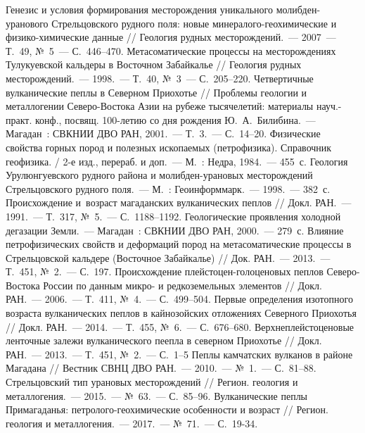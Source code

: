 \begin{thebibliography}{99}
\bibitem{} Генезис и условия формирования месторождения уникального молибден-уранового Стрельцовского рудного поля: новые минералого-геохимические и физико-химические данные // Геология рудных месторождений.~--- 2007~--- Т.~49, №~5~--- С.~446--470.
\bibitem{} Метасоматические процессы на месторождениях Тулукуевской кальдеры в Восточном Забайкалье // Геология рудных месторождений.~--- 1998.~--- Т.~40, №~3~--- С.~205--220.
\bibitem{} Четвертичные вулканические пеплы в Северном Приохотье // Проблемы геологии и металлогении Северо-Востока Азии на рубеже тысячелетий: материалы науч.-практ. конф., посвящ. 100-летию со дня рождения Ю.~А.~Билибина.~--- Магадан~: СВКНИИ ДВО РАН, 2001.~--- Т.~3.~--- С.~14--20.
\bibitem{} Физические свойства горных пород и полезных ископаемых (петрофизика). Справочник геофизика. / 2-е изд., перераб. и доп.~--- М.~: Недра, 1984.~--- 455~с.
\bibitem{} Геология Урулюнгуевского рудного района и молибден-урановых месторождений Стрельцовского рудного поля.~--- М.~: Геоинформмарк.~--- 1998.~--- 382~с.
\bibitem{} Происхождение и~возраст магаданских вулканических пеплов // Докл. РАН.~--- 1991.~--- Т.~317, №~5.~--- С.~1188--1192.
\bibitem{} Геологические проявления холодной дегазации Земли.~--- Магадан~: СВКНИИ ДВО РАН, 2000.~--- 279~с.
\bibitem{} Влияние петрофизических свойств и деформаций пород на метасоматические процессы в Стрельцовской кальдере (Восточное Забайкалье) // Док. РАН.~---  2013.~--- Т.~451, №~2.~--- С.~197.
\bibitem{} Происхождение плейстоцен-голоценовых пеплов Северо-Востока России по данным микро- и редкоземельных элементов // Докл. РАН.~--- 2006.~--- Т.~411, №~4.~--- С.~499--504.
\bibitem{} Первые определения изотопного возраста вулканических пеплов в кайнозойских отложениях Северного Приохотья // Докл. РАН.~--- 2014.~--- Т.~455, №~6.~--- С.~676--680.
\bibitem{} Верхнеплейстоценовые ленточные залежи вулканического пеепла в северном Приохотье // Докл. РАН.~--- 2013.~--- Т.~451, №~2.~--- С.~1--5
\bibitem{} Пеплы камчатских вулканов в районе Магадана // Вестник СВНЦ ДВО РАН.~--- 2010.~--- №~1.~--- С.~81--88.
\bibitem{} Стрельцовский тип урановых месторождений // Регион. геология и металлогения.~--- 2015.~--- №~63.~--- С.~85--96.
\bibitem{} Вулканические пеплы Примагаданья: петролого-геохимические особенности и возраст // Регион. геология и металлогения.~--- 2017.~--- №~71.~--- С.~19-34.

\end{thebibliography}
